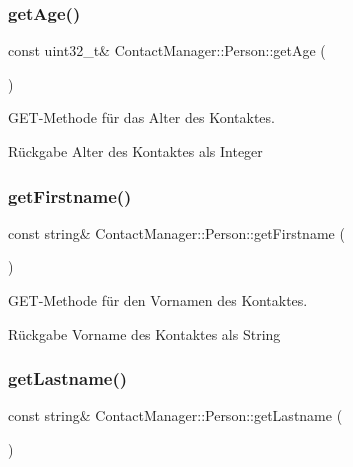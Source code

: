 \subsubsection{\texorpdfstring{get\+Age()}{getAge()}}
{\footnotesize\ttfamily const uint32\+\_\+t\& Contact\+Manager\+::\+Person\+::get\+Age (\begin{DoxyParamCaption}{ }\end{DoxyParamCaption})\hspace{0.3cm}{\ttfamily [inline]}}



G\+E\+T-\/\+Methode für das Alter des Kontaktes.

\begin{DoxyReturn}{Rückgabe}
Alter des Kontaktes als Integer
\end{DoxyReturn}
\mbox{\label{classContactManager_1_1Person_a22614abf3860a8a1232b12477b91fd86}} 
\subsubsection{\texorpdfstring{get\+Firstname()}{getFirstname()}}
{\footnotesize\ttfamily const string\& Contact\+Manager\+::\+Person\+::get\+Firstname (\begin{DoxyParamCaption}{ }\end{DoxyParamCaption})\hspace{0.3cm}{\ttfamily [inline]}}



G\+E\+T-\/\+Methode für den Vornamen des Kontaktes.

\begin{DoxyReturn}{Rückgabe}
Vorname des Kontaktes als String
\end{DoxyReturn}
\mbox{\label{classContactManager_1_1Person_afc0fffbd413c5767998772af068a1230}} 
\subsubsection{\texorpdfstring{get\+Lastname()}{getLastname()}}
{\footnotesize\ttfamily const string\& Contact\+Manager\+::\+Person\+::get\+Lastname (\begin{DoxyParamCaption}{ }\end{DoxyParamCaption})\hspace{0.3cm}{\ttfamily [inline]}}



